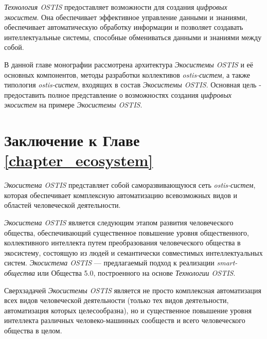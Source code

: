 \textit{Технология OSTIS} предоставляет возможности для создания \textit{цифровых экосистем}. Она обеспечивает эффективное управление данными и знаниями, обеспечивает автоматическую обработку информации и позволяет создавать интеллектуальные системы, способные обмениваться данными и знаниями между собой.

В данной главе монографии рассмотрена архитектура \textit{Экосистемы OSTIS} и её основных компонентов, методы разработки коллективов \textit{ostis-систем}, а также типология \textit{ostis-систем}, входящих в состав \textit{Экосистемы OSTIS}. Основная цель - предоставить полное представление о возможностях создания \textit{цифровых экосистем} на примере \textit{Экосистемы OSTIS}.






%

\section*{Заключение к Главе \ref{chapter_ecosystem}}

\textit{Экосистема OSTIS} представляет собой саморазвивающуюся сеть \textit{ostis-систем}, которая обеспечивает комплексную автоматизацию всевозможных видов и областей человеческой деятельности. 

\textit{Экосистема OSTIS} является следующим этапом развития человеческого общества, обеспечивающий существенное повышение уровня общественного, коллективного интеллекта путем преобразования человеческого общества в экосистему, состоящую из людей и семантически совместимых интеллектуальных систем. 
\textit{Экосистема OSTIS} --- предлагаемый подход к реализации \textit{smart-общества} или Общества 5.0, построенного на основе \textit{Технологии OSTIS}.

Сверхзадачей \textit{Экосистемы OSTIS} является не просто комплексная автоматизация всех видов человеческой деятельности (только тех видов деятельности, автоматизация которых целесообразна), но и существенное повышение уровня интеллекта различных человеко-машинных сообществ и всего человеческого общества в целом.
